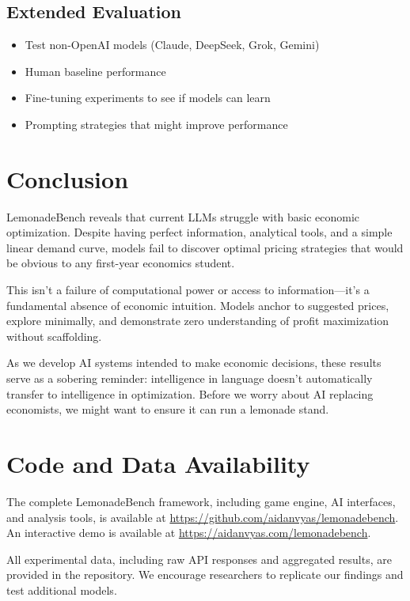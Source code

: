 \documentclass[11pt]{article}
\begin{document}
\subsection{Extended Evaluation}
\begin{itemize}
    \item Test non-OpenAI models (Claude, DeepSeek, Grok, Gemini)
    \item Human baseline performance
    \item Fine-tuning experiments to see if models can learn
    \item Prompting strategies that might improve performance
\end{itemize}

\section{Conclusion}

LemonadeBench reveals that current LLMs struggle with basic economic optimization. Despite having perfect information, analytical tools, and a simple linear demand curve, models fail to discover optimal pricing strategies that would be obvious to any first-year economics student.

This isn't a failure of computational power or access to information—it's a fundamental absence of economic intuition. Models anchor to suggested prices, explore minimally, and demonstrate zero understanding of profit maximization without scaffolding.

As we develop AI systems intended to make economic decisions, these results serve as a sobering reminder: intelligence in language doesn't automatically transfer to intelligence in optimization. Before we worry about AI replacing economists, we might want to ensure it can run a lemonade stand.

\section*{Code and Data Availability}

The complete LemonadeBench framework, including game engine, AI interfaces, and analysis tools, is available at \url{https://github.com/aidanvyas/lemonadebench}. An interactive demo is available at \url{https://aidanvyas.com/lemonadebench}.

All experimental data, including raw API responses and aggregated results, are provided in the repository. We encourage researchers to replicate our findings and test additional models.
\end{document}
